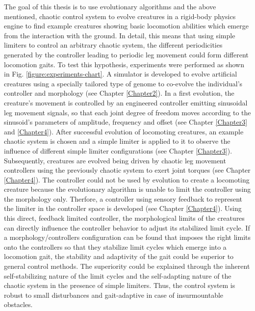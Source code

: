 \documentclass[main]{subfiles}
\begin{document}
The goal of this thesis is to use evolutionary algorithms and the above mentioned, chaotic control system to evolve creatures in a rigid-body physics engine to find example creatures showing basic locomotion abilities which emerge from the interaction with the ground. %
%
In detail, this means that using simple limiters to control an arbitrary chaotic system, the different periodicities generated by the controller leading to periodic leg movement could form different locomotion gaits. %
%
To test this hypothesis, experiments were performed as shown in Fig. \ref{figure:experiments-chart}. %
%
A simulator is developed to evolve artificial creatures using a specially tailored type of genome to co-evolve the individual's controller and morphology (see Chapter \ref{Chapter2}). %
%
In a first evolution, the creature's movement is controlled by an engineered controller emitting sinusoidal leg movement signals, so that each joint degree of freedom moves according to the sinusoid's parameters of amplitude, frequency and offset (see Chapter \ref{Chapter3} and \ref{Chapter4}). %
%
After successful evolution of locomoting creatures, an example chaotic system is chosen and a simple limiter is applied to it to observe the influence of different simple limiter configurations (see Chapter \ref{Chapter3}). %
%
Subsequently, creatures are evolved being driven by chaotic leg movement controllers using the previously chaotic system to exert joint torques (see Chapter \ref{Chapter4}). %
%
The controller could not be used by evolution to create a locomoting creature because the evolutionary algorithm is unable to limit the controller using the morphology only. %
%
Therfore, a controller using sensory feedback to represent the limiter in the controller space is developed (see Chapter \ref{Chapter4}). %
%
Using this direct, feedback limited controller, the morphological limits of the creatures can directly influence the controller behavior to adjust its stabilized limit cycle. %
%
If a morphology/controllers configuration can be found that imposes the right limits onto the controllers so that they stabilize limit cycles which emerge into a locomotion gait, the stability and adaptivity of the gait could be superior to general control methods. %
%
The superiority could be explained through the inherent self-stabilizing nature of the limit cycles and the self-adapting nature of the chaotic system in the presence of simple limiters. %
%
Thus, the control system is robust to small disturbances and gait-adaptive in case of insurmountable obstacles. %
\end{document}
